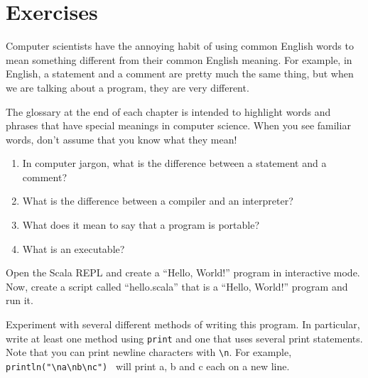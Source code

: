 \documentclass[10pt]{book}
\begin{document}
\section{Exercises}

\begin{ex}

Computer scientists have the annoying habit of using common
English words to mean something different from their common
English meaning.  For example, in English, a statement and
a comment are pretty much the same thing, but when we are
talking about a program, they are very different.

The glossary at the end of each chapter is intended to highlight
words and phrases that have special meanings in computer science.
When you see familiar words, don't assume that you know what 
they mean!

\begin{enumerate}

\item In computer jargon, what is the difference between a statement and a comment?

\item What is the difference between a compiler and an interpreter?

\item What does it mean to say that a program is portable?

\item What is an executable?

\end{enumerate}

\end{ex}

\begin{ex}
Open the Scala REPL and create a ``Hello, World!'' program in interactive mode. Now, create a script called ``hello.scala'' that is a ``Hello, World!'' program and run it.
\end{ex}

\begin{ex}
Experiment with several different methods of writing this program. In particular, write at least one method using {\tt print} and one that uses several print statements. Note that you can print newline characters with {\tt \verb"\"n}. For example, {\tt println(\verb"""\verb"\"na\verb"\"nb\verb"\"nc\verb""") } will print a, b and c each on a new line.

\end{ex}
\end{document}
